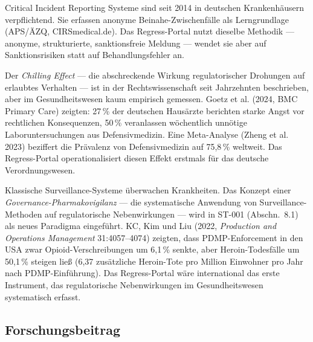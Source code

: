 \documentclass{umbruch-position}
\begin{document}
\begin{infobox}
Critical Incident Reporting Systeme sind seit 2014 in deutschen Krankenhäusern verpflichtend. Sie erfassen anonyme Beinahe-Zwischenfälle als Lerngrundlage (APS/ÄZQ, CIRSmedical.de). Das Regress-Portal nutzt dieselbe Methodik — anonyme, strukturierte, sanktionsfreie Meldung — wendet sie aber auf Sanktionsrisiken statt auf Behandlungsfehler an.
\end{infobox}

\begin{infobox}
Der \textit{Chilling Effect} — die abschreckende Wirkung regulatorischer Drohungen auf erlaubtes Verhalten — ist in der Rechtswissenschaft seit Jahrzehnten beschrieben, aber im Gesundheitswesen kaum empirisch gemessen. Goetz et al. (2024, BMC Primary Care) zeigten: 27\,\% der deutschen Hausärzte berichten starke Angst vor rechtlichen Konsequenzen, 50\,\% veranlassen wöchentlich unnötige Laboruntersuchungen aus Defensivmedizin. Eine Meta-Analyse (Zheng et al. 2023) beziffert die Prävalenz von Defensivmedizin auf 75,8\,\% weltweit. Das Regress-Portal operationalisiert diesen Effekt erstmals für das deutsche Verordnungswesen.
\end{infobox}

\begin{infobox}
Klassische Surveillance-Systeme überwachen Krankheiten. Das Konzept einer \textit{Governance-Pharmakovigilanz} --- die systematische Anwendung von Surveillance-Methoden auf regulatorische Nebenwirkungen --- wird in ST-001 (Abschn.~8.1) als neues Paradigma eingeführt. KC, Kim und Liu (2022, \textit{Production and Operations Management} 31:4057--4074) zeigten, dass PDMP-Enforcement in den USA zwar Opioid-Verschreibungen um 6,1\,\% senkte, aber Heroin-Todesf\"alle um 50,1\,\% steigen lie\ss{} (6,37 zus\"atzliche Heroin-Tote pro Million Einwohner pro Jahr nach PDMP-Einf\"uhrung). Das Regress-Portal wäre international das erste Instrument, das regulatorische Nebenwirkungen im Gesundheitswesen systematisch erfasst.
\end{infobox}

\subsection{Forschungsbeitrag}
\end{document}
